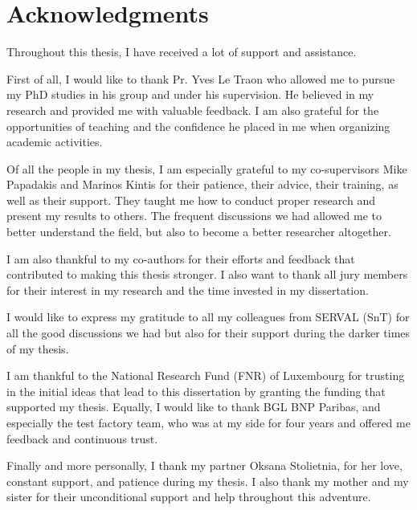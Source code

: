 \chapter*{Acknowledgments}

Throughout this thesis, I have received a lot of support and assistance.

First of all, I would like to thank Pr. Yves Le Traon who allowed me to
pursue my PhD studies in his group and under his supervision. He believed in my research and provided me with valuable feedback. I am also grateful for the opportunities of teaching and the confidence he placed in me when organizing academic activities.

Of all the people in my thesis, I am especially grateful to my co-supervisors Mike Papadakis and Marinos Kintis for their patience, their advice, their training, as well as their support. They taught me how to conduct proper research and present my results to others. The frequent discussions we had allowed me to better understand the field, but also to become a better researcher altogether.

I am also thankful to my co-authors for their efforts and feedback that contributed to making this thesis stronger. I also want to thank all jury members for their interest in my research and the time invested in my dissertation.

I would like to express my gratitude to all my colleagues from SERVAL (SnT) for all the good discussions we had but also for their support during the darker times of my thesis.

I am thankful to the National Research Fund (FNR) of Luxembourg for trusting in the initial ideas that lead to this dissertation by granting the funding that supported my thesis. Equally, I would like to thank BGL BNP Paribas, and especially the test factory team, who was at my side for four years and offered me feedback and continuous trust.

Finally and more personally, I thank my partner Oksana Stolietnia, for her love, constant support, and patience during my thesis. I also thank my mother and my sister for their unconditional support and help throughout this adventure.